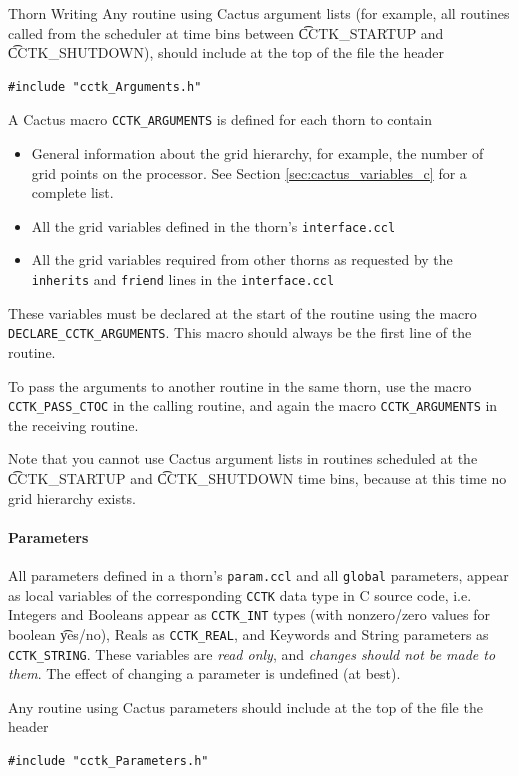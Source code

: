 \begin{cactuspart}{Thorn Writing}
Any routine using Cactus argument lists (for example, all routines called from
the scheduler at time bins between {\t CCTK\_STARTUP} and {\t CCTK\_SHUTDOWN}),
should include at the top of the file the header
\begin{verbatim}
#include "cctk_Arguments.h"
\end{verbatim}

A Cactus macro \texttt{CCTK\_ARGUMENTS} is defined for each thorn
to contain
\begin{itemize}
\item General information about the grid hierarchy, for example, the
number of grid points on the processor. See Section \ref{sec:cactus_variables_c}
for a complete list.
\item All the grid variables defined in the thorn's \texttt{interface.ccl}
\item All the grid variables required from other thorns as requested by
      the \texttt{inherits} and \texttt{friend} lines in the \texttt{interface.ccl}
\end{itemize}
These variables must be declared at the start of the routine using
the macro \texttt{DECLARE\_CCTK\_ARGUMENTS}. This macro should always be the
first line of the routine.

To pass the arguments to another routine in the same thorn, use the macro
\texttt{CCTK\_PASS\_CTOC} in the calling routine, and again the macro
\texttt{CCTK\_ARGUMENTS} in the receiving routine.

Note that you cannot use Cactus argument lists in routines scheduled at the
{\t CCTK\_STARTUP} and {\t CCTK\_SHUTDOWN} time bins, because at this time
no grid hierarchy exists.


\paragraph{Parameters}

All parameters defined in a thorn's \texttt{param.ccl} and all \texttt{global}
parameters, appear as local variables of the corresponding \texttt{CCTK} data type
in C source code, i.e. Integers and Booleans appear as \texttt{CCTK\_INT} types
(with nonzero/zero values for boolean {\t yes/no}), Reals as
\texttt{CCTK\_REAL}, and Keywords and String parameters as \texttt{CCTK\_STRING}.
These variables are \emph{read only}, and \emph{changes should not be made to
them}.  The effect of changing a parameter is undefined (at best).

Any routine using Cactus parameters should include at
the top of the file the header
\begin{verbatim}
#include "cctk_Parameters.h"
\end{verbatim}


\end{cactuspart}
